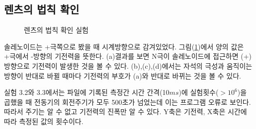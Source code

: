 \documentclass[a4paper]{article}
\begin{document}
	\subsection{렌츠의 법칙 확인}
		\begin{figure}[h]
			\centering
			\caption{렌츠의 법칙 확인 실험} \label{fig:lentz}
		\end{figure}
	솔레노이드는 +극쪽으로 봤을 때 시계방향으로 감겨있었다. 그림(\ref{fig:lentz})에서 양의 값은 +극에서 -방향의 기전력을 뜻한다. (a)결과를 보면 N극이 솔레노이드에 접근하면 (+)방향으로 기전력이 발생한 것을 볼 수 있다. (b),(c),(d)에서는 자석의 극성과 움직이는 방향이 반대로 바뀔 때마다 기전력의 부호가 (a)와 반대로 바뀌는 것을 볼 수 있다.

\newpage
	실험 3.2와 3.3에서는 파일에 기록된 측정간 시간 간격(10$\si{ms}$)에 실험횟수($>10^6$)을 곱했을 때 전동기의 회전주기가 모두 500초가 넘었는데 이는 프로그램 오류로 보인다.
	따라서 주기는 알 수 없고 기전력의 진폭만 알 수 있다.
	Y축은 기전력, X축은 시간에 따라 측정된 값의 횟수이다. 
\end{document}
